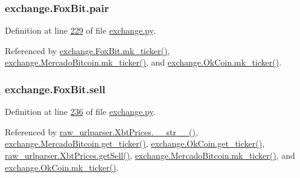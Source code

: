 \subsubsection[{\texorpdfstring{pair}{pair}}]{\setlength{\rightskip}{0pt plus 5cm}exchange.\+Fox\+Bit.\+pair}\hypertarget{classexchange_1_1_fox_bit_abfd6daf1cbad94eb74bba4c97fe4a574}{}\label{classexchange_1_1_fox_bit_abfd6daf1cbad94eb74bba4c97fe4a574}


Definition at line \hyperlink{exchange_8py_source_l00229}{229} of file \hyperlink{exchange_8py_source}{exchange.\+py}.



Referenced by \hyperlink{exchange_8py_source_l00245}{exchange.\+Fox\+Bit.\+mk\+\_\+ticker()}, \hyperlink{exchange_8py_source_l00320}{exchange.\+Mercado\+Bitcoin.\+mk\+\_\+ticker()}, and \hyperlink{exchange_8py_source_l00385}{exchange.\+Ok\+Coin.\+mk\+\_\+ticker()}.

\subsubsection[{\texorpdfstring{sell}{sell}}]{\setlength{\rightskip}{0pt plus 5cm}exchange.\+Fox\+Bit.\+sell}\hypertarget{classexchange_1_1_fox_bit_ac1fae4ef7a43254b71d7173a5cc6eeaf}{}\label{classexchange_1_1_fox_bit_ac1fae4ef7a43254b71d7173a5cc6eeaf}


Definition at line \hyperlink{exchange_8py_source_l00236}{236} of file \hyperlink{exchange_8py_source}{exchange.\+py}.



Referenced by \hyperlink{raw__urlparser_8py_source_l00074}{raw\+\_\+urlparser.\+Xbt\+Prices.\+\_\+\+\_\+str\+\_\+\+\_\+()}, \hyperlink{exchange_8py_source_l00306}{exchange.\+Mercado\+Bitcoin.\+get\+\_\+ticker()}, \hyperlink{exchange_8py_source_l00371}{exchange.\+Ok\+Coin.\+get\+\_\+ticker()}, \hyperlink{raw__urlparser_8py_source_l00065}{raw\+\_\+urlparser.\+Xbt\+Prices.\+get\+Sell()}, \hyperlink{exchange_8py_source_l00320}{exchange.\+Mercado\+Bitcoin.\+mk\+\_\+ticker()}, and \hyperlink{exchange_8py_source_l00385}{exchange.\+Ok\+Coin.\+mk\+\_\+ticker()}.

